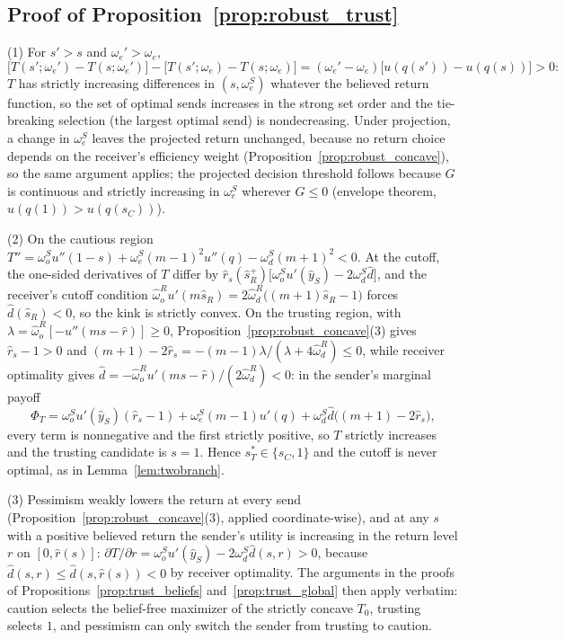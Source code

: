 \documentclass[11pt]{article}
\theoremstyle{plain}
\theoremstyle{remark}
\begin{document}
\subsection*{Proof of Proposition~\ref{prop:robust_trust}}

(1) For $s'>s$ and $\omega_e'>\omega_e$,
\[
        \big[T(s';\omega_e')-T(s;\omega_e')\big]-\big[T(s';\omega_e)-T(s;\omega_e)\big]
        =(\omega_e'-\omega_e)\big[u(q(s'))-u(q(s))\big]>0:
\]
$T$ has strictly increasing differences in $(s,\omega_e^S)$ whatever the believed return function, so the set of optimal sends increases in the strong set order and the tie-breaking selection (the largest optimal send) is nondecreasing.  Under projection, a change in $\omega_e^S$ leaves the projected return unchanged, because no return choice depends on the receiver's efficiency weight (Proposition~\ref{prop:robust_concave}), so the same argument applies; the projected decision threshold follows because $G$ is continuous and strictly increasing in $\omega_e^S$ wherever $G\le0$ (envelope theorem, $u(q(1))>u(q(s_C))$).

(2) On the cautious region $T''=\omega_o^S u''(1-s)+\omega_e^S(m-1)^2u''(q)-\omega_d^S(m+1)^2<0$.  At the cutoff, the one-sided derivatives of $T$ differ by $\hat r_s(\hat s_R^+)\big[\omega_o^S u'(\hat y_S)-2\omega_d^S\hat d\big]$, and the receiver's cutoff condition $\hat\omega_o^{R}u'(m\hat s_R)=2\hat\omega_d^{R}\big((m+1)\hat s_R-1\big)$ forces $\hat d(\hat s_R)<0$, so the kink is strictly convex.  On the trusting region, with $\lambda=\hat\omega_o^{R}[-u''(ms-\hat r)]\ge0$, Proposition~\ref{prop:robust_concave}(3) gives $\hat r_s-1>0$ and $(m+1)-2\hat r_s=-(m-1)\lambda/(\lambda+4\hat\omega_d^{R})\le0$, while receiver optimality gives $\hat d=-\hat\omega_o^{R}u'(ms-\hat r)/(2\hat\omega_d^{R})<0$: in the sender's marginal payoff
\[
        \Phi_T=\omega_o^S u'(\hat y_S)(\hat r_s-1)+\omega_e^S(m-1)u'(q)+\omega_d^S\hat d\big((m+1)-2\hat r_s\big),
\]
every term is nonnegative and the first strictly positive, so $T$ strictly increases and the trusting candidate is $s=1$.  Hence $s_T^\ast\in\{s_C,1\}$ and the cutoff is never optimal, as in Lemma~\ref{lem:twobranch}.

(3) Pessimism weakly lowers the return at every send (Proposition~\ref{prop:robust_concave}(3), applied coordinate-wise), and at any $s$ with a positive believed return the sender's utility is increasing in the return level $r$ on $[0,\hat r(s)]$: $\partial T/\partial r=\omega_o^S u'(\hat y_S)-2\omega_d^S\hat d(s,r)>0$, because $\hat d(s,r)\le\hat d(s,\hat r(s))<0$ by receiver optimality.  The arguments in the proofs of Propositions~\ref{prop:trust_beliefs} and~\ref{prop:trust_global} then apply verbatim: caution selects the belief-free maximizer of the strictly concave $T_0$, trusting selects $1$, and pessimism can only switch the sender from trusting to caution.
\end{document}

